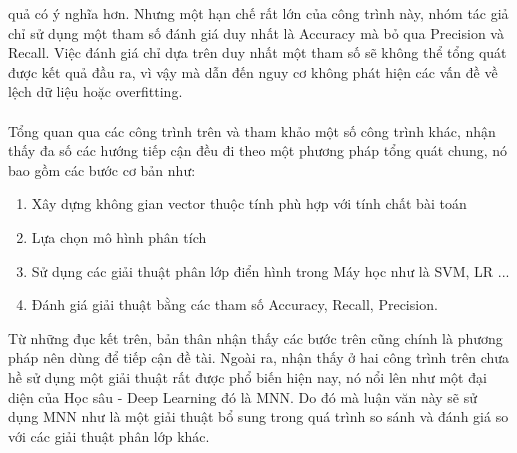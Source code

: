 quả có ý nghĩa hơn. Nhưng một hạn chế rất lớn của công trình này, nhóm tác giả 
chỉ sử dụng một tham số đánh giá duy nhất là Accuracy mà bỏ qua Precision và 
Recall. Việc đánh giá chỉ dựa trên duy nhất một tham số sẽ không thể tổng quát 
được kết quả đầu ra, vì vậy mà dẫn đến nguy cơ không phát hiện các vấn đề về 
lệch dữ liệu hoặc overfitting.\\\\ 
Tổng quan qua các công trình trên và tham khảo một số công trình khác, nhận thấy 
đa số các hướng tiếp cận đều đi theo một phương pháp tổng quát chung, nó bao gồm các bước 
cơ bản như:
\begin{enumerate}
\item Xây dựng không gian vector thuộc tính phù hợp với tính chất bài toán
\item Lựa chọn mô hình phân tích
\item Sử dụng các giải thuật phân lớp điển hình trong Máy học như là 
SVM, LR ...
\item Đánh giá giải thuật bằng các tham số Accuracy, Recall, Precision.
\end{enumerate}
Từ những đục kết trên, bản thân nhận thấy các bước trên cũng chính là phương pháp 
nên dùng để tiếp cận đề tài. Ngoài ra, nhận thấy ở hai công trình trên chưa 
hề sử dụng một giải thuật rất được phổ biến hiện nay, nó nổi lên như một đại 
diện của Học sâu - Deep Learning đó là MNN. Do đó mà luận văn này sẽ sử dụng 
MNN như là một giải thuật bổ sung trong quá trình so sánh và đánh giá so với 
các giải thuật phân lớp khác.